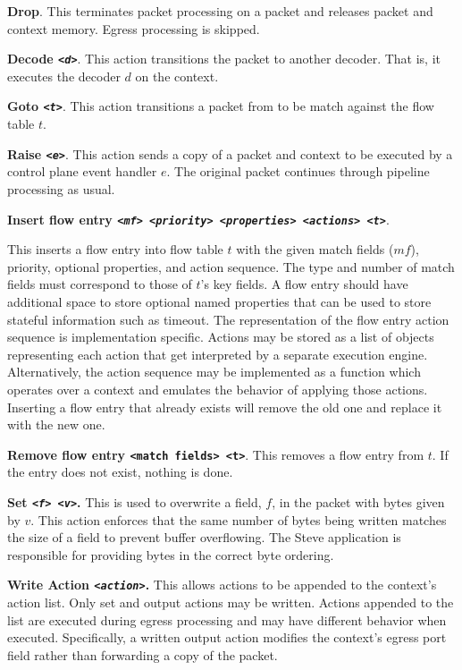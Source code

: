 \textbf{Drop}. This terminates packet processing on a packet and releases packet and context memory. Egress processing is skipped.

\textbf{Decode \emph{\texttt{<d>}}}. This action transitions the packet to another decoder. That is, it executes the decoder $d$ on the context.

\textbf{Goto \emph{\texttt{<t>}}}. This action transitions a packet from to be match against the flow table $t$. 

\textbf{Raise \emph{\texttt{<e>}}}. This action sends a copy of a packet and context to
be executed by a control plane event handler $e$. 
The original packet continues through pipeline processing as usual.

\textbf{Insert flow entry \emph{\texttt{<mf> <priority> <properties> <actions> <t>}}}. 

This inserts a flow entry into flow table $t$ with the given match fields ($mf$), priority, optional properties, and action sequence. The type and number of match
fields must correspond to those of $t$'s key fields. A flow entry should have additional space to store optional named properties that can be used to store stateful information such as timeout. The representation of the flow entry action sequence is implementation specific. Actions may be stored as a list of objects representing each action that get interpreted by a separate execution engine. Alternatively, the action sequence may be implemented as a function which operates over a context and emulates the behavior of applying those actions. 
Inserting a flow entry that already exists will remove the old one and replace it with the new one. 

\textbf{Remove flow entry \texttt{<match fields> <t>}}. This removes a flow entry from $t$.
If the entry does not exist, nothing is done.

\textbf{Set \emph{\texttt{<f> <v>}}.} This is used to overwrite a field, $f$, in the packet with bytes given by $v$. This action enforces that the same number of bytes being written matches the size of a field to prevent buffer overflowing. The Steve application is responsible for providing bytes in the correct byte ordering.

\textbf{Write Action \emph{\texttt{<action>}}.} This allows actions to be appended to the context's
action list. Only set and output actions may be written. Actions appended to the list are executed during egress processing and may have different behavior when executed. Specifically, a written output action modifies the context's egress port field rather than forwarding a copy of the packet.

